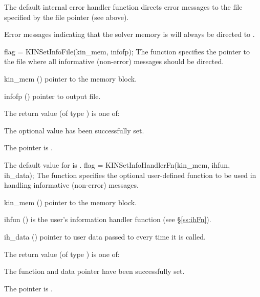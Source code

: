 {
  The default internal error handler function directs error messages to the
  file specified by the file pointer  (see  above).

  Error messages indicating that the {\kinsol} solver memory is  will
  always be directed to .
}
{
flag = KINSetInfoFile(kin\_mem, infofp);
}
{
  The function  specifies the pointer to the file
  where all informative (non-error) messages should be directed.
}
{
  \begin{args}
  \item[kin\_mem] ()
    pointer to the {\kinsol} memory block.
  \item[infofp] ()
    pointer to output file.
  \end{args}
}
{
  The return value  (of type ) is one of:
  \begin{args}
  \item[\Id{KIN\_SUCCESS}]
    The optional value has been successfully set.
  \item[\Id{KIN\_MEM\_NULL}]
    The  pointer is .
  \end{args}
}
{
  The default value for  is .
}
{
flag = KINSetInfoHandlerFn(kin\_mem, ihfun, ih\_data);
}
{
  The function  specifies the optional user-defined function
  to be used in handling informative (non-error) messages.
}
{
  \begin{args}
  \item[kin\_mem] ()
    pointer to the {\kinsol} memory block.
  \item[ihfun] ()
    is the user's {\CC} information handler function (see \S\ref{ss:ihFn}).
  \item[ih\_data] ()
    pointer to user data passed to  every time it is called.
  \end{args}
}
{
  The return value  (of type ) is one of:
  \begin{args}
  \item[\Id{KIN\_SUCCESS}]
    The function  and data pointer  have been successfully set.
  \item[\Id{KIN\_MEM\_NULL}]
    The  pointer is .
  \end{args}
}
